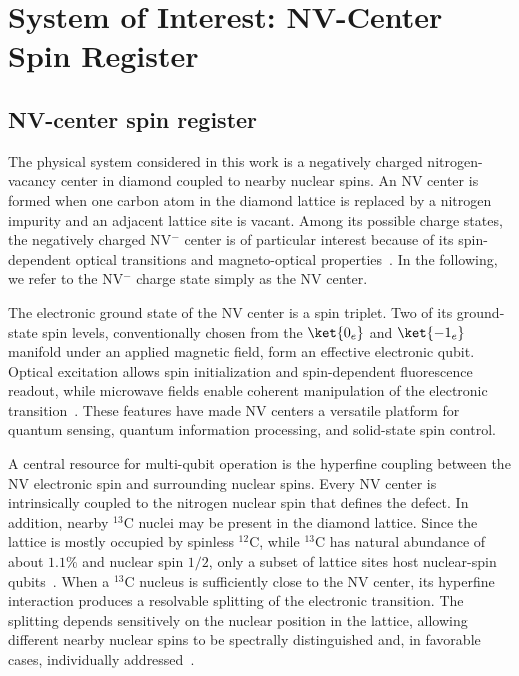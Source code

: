\documentclass[
  aps,
  pra,
  reprint,            %
  superscriptaddress, %
  amsmath,amssymb,
  notitlepage
]{revtex4-2}
\begin{document}
\section{System of Interest: NV-Center Spin Register}
\label{sec:system_of_interest}

\subsection{NV-center spin register}
\label{subsec:nv_register}

The physical system considered in this work is a negatively charged nitrogen-vacancy center in diamond coupled to nearby nuclear spins. An NV center is formed when one carbon atom in the diamond lattice is replaced by a nitrogen impurity and an adjacent lattice site is vacant. Among its possible charge states, the negatively charged NV$^-$ center is of particular interest because of its spin-dependent optical transitions and magneto-optical properties~\cite{phila,Schir}. In the following, we refer to the NV$^-$ charge state simply as the NV center.

The electronic ground state of the NV center is a spin triplet. Two of its ground-state spin levels, conventionally chosen from the $\ket{0_e}$ and $\ket{-1_e}$ manifold under an applied magnetic field, form an effective electronic qubit. Optical excitation allows spin initialization and spin-dependent fluorescence readout, while microwave fields enable coherent manipulation of the electronic transition~\cite{phila}. These features have made NV centers a versatile platform for quantum sensing, quantum information processing, and solid-state spin control.

A central resource for multi-qubit operation is the hyperfine coupling between the NV electronic spin and surrounding nuclear spins. Every NV center is intrinsically coupled to the nitrogen nuclear spin that defines the defect. In addition, nearby $^{13}\mathrm{C}$ nuclei may be present in the diamond lattice. Since the lattice is mostly occupied by spinless $^{12}\mathrm{C}$, while $^{13}\mathrm{C}$ has natural abundance of about $1.1\%$ and nuclear spin $1/2$, only a subset of lattice sites host nuclear-spin qubits~\cite{neumann}. When a $^{13}\mathrm{C}$ nucleus is sufficiently close to the NV center, its hyperfine interaction produces a resolvable splitting of the electronic transition. The splitting depends sensitively on the nuclear position in the lattice, allowing different nearby nuclear spins to be spectrally distinguished and, in favorable cases, individually addressed~\cite{neumann,nizovtsev2018nonflipping,nizovtsev2021hyperfine}.
\end{document}
